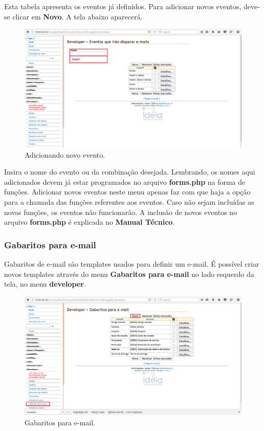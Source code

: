 \documentclass[9pt]{report}
\begin{document}
{      Esta tabela apresenta os eventos já definidos. Para adicionar
      novos eventos, deve-se clicar em \textbf{Novo}. A tela abaixo
      aparecerá.

      \begin{figure}[H]
        \includegraphics[width=\textwidth]{2_Formularios/6_Envio_de_email/56.png}
        \caption{Adicionando novo evento.}
        \label{fig:novoeventosemail}
      \end{figure}

      Insira o nome do evento ou da combinação desejada. Lembrando,
      os nomes aqui adicionados devem já estar programados no arquivo
      \textbf{forms.php} na forma de funções. Adicionar novos eventos
      neste menu apenas faz com que haja a opção para a chamada das
      funções referentes aos eventos. Caso não sejam incluídas as
      novas funções, os eventos não funcionarão. A inclusão de novos
      eventos no arquivo \textbf{forms.php} é explicada no
      \textbf{Manual Técnico}.

      \subsubsection{Gabaritos para e-mail}

      Gabaritos de e-mail são templates usados para definir um e-mail. É possível criar novos templates através do menu \textbf{Gabaritos para e-mail} no lado esquerdo da tela, no menu \textbf{developer}.

      \begin{figure}[H]
        \includegraphics[width=\textwidth]{2_Formularios/6_Envio_de_email/57.png}
        \caption{Gabaritos para e-mail.}
        \label{fig:gabaritosemail}
      \end{figure}

}
\end{document}
